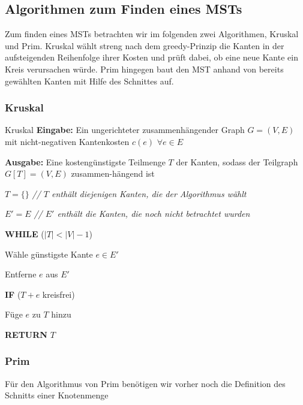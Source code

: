 \documentclass{panikzettel}
\newcommand\tab[1][1cm]{\hspace*{#1}}
\begin{document}

\subsection{Algorithmen zum Finden eines MSTs}

Zum finden eines MSTs betrachten wir im folgenden zwei Algorithmen, Kruskal und Prim. Kruskal wählt streng nach dem greedy-Prinzip die Kanten in der aufsteigenden Reihenfolge ihrer Kosten und prüft dabei, ob eine neue Kante ein Kreis verursachen würde. Prim hingegen baut den MST anhand von bereits gewählten Kanten mit Hilfe des Schnittes auf.

\subsubsection{Kruskal}

\begin{algo}{Kruskal}
	\textbf{Eingabe:} Ein ungerichteter zusammenhängender Graph $G = (V,E)$ mit nicht-negativen Kantenkosten $c(e)$ $\forall e \in E$
	
	\textbf{Ausgabe:} Eine kostengünstigste Teilmenge $T$ der Kanten, sodass der Teilgraph $G[T] = (V,E)$ zusammen-hängend ist
	
	\tcblower
	
	$T = \{ \}$ \textit{ \color{gray} // $T$ enthält diejenigen Kanten, die der Algorithmus wählt }
	
	$E' = E$ \textit{ \color{gray} // $E'$ enthält die Kanten, die noch nicht betrachtet wurden }
	
	\textbf{WHILE} ($|T| < |V| - 1$)
	
	\tab Wähle günstigste Kante $e \in E'$
	
	\tab Entferne $e$ aus $E'$
	
	\tab \textbf{IF} ($T+e$ kreisfrei)
	
	\tab\tab Füge $e$ zu $T$ hinzu
		
	\textbf{RETURN} $T$
\end{algo}

\subsubsection{Prim}

Für den Algorithmus von Prim benötigen wir vorher noch die Definition des Schnitts einer Knotenmenge
\end{document}

